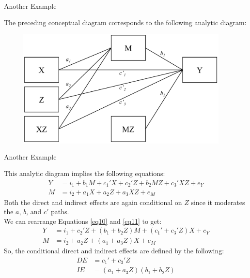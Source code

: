 \documentclass{beamer}
\newcommand{\va}[0]{\vspace{12pt}}
\newcommand{\vb}[0]{\vspace{6pt}}
\begin{document}
\begin{frame}{Another Example}
  
  The preceding conceptual diagram corresponds to the following
  analytic diagram: 
  \vb
  \begin{figure}
    \includegraphics[width=0.95\textwidth]{figures/modABCwithZAnalytic.pdf}
  \end{figure}
  
\end{frame}



\begin{frame}{Another Example}
  
  This analytic diagram implies the following equations:
  \begin{align}
    Y &= i_1 + b_1M + c_1'X + c_2'Z + b_2MZ + c_3'XZ + e_Y \label{eq10}\\
    M &= i_2 + a_1X + a_2Z + a_3XZ + e_M \label{eq11}
  \end{align}
  \pause 
  Both the direct and indirect effects are again conditional on
  $Z$ since it moderates the $a$, $b$, and $c'$ paths.\\ 
  \va 
  \pause 
  We can rearrange Equations \ref{eq10} and \ref{eq11} to get:
  \begin{align*}
    Y &= i_1 + c_2'Z + \left( b_1 + b_2Z \right)M + \left( c_1' + c_3'Z \right)X + e_Y\\
    M &= i_2 + a_2Z + \left( a_1 + a_3Z \right)X + e_M
  \end{align*}
  So, the conditional direct and indirect effects are defined by the
  following:
  \begin{align*}
    DE &= c_1' + c_3'Z\\
    IE &= \left(a_1 + a_3Z \right) \left(b_1 + b_2Z \right)
  \end{align*}
  
\end{frame}
\end{document}
